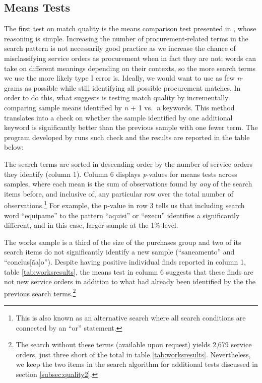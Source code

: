 \documentclass[11pt]{article}
\begin{document}
\subsection{Means Tests}\label{subsec:quality1}

The first test on match quality is the means comparison test presented in \citet{AssumpcaotextfindDataDrivenText2018}, whose reasoning is simple. Increasing the number of procurement-related terms in the search pattern is not necessarily good practice as we increase the chance of misclassifying service orders as procurement when in fact they are not; words can take on different meanings depending on their contexts, so the more search terms we use the more likely type I error is. Ideally, we would want to use as few \emph{n}-grams as possible while still identifying all possible procurement matches. In order to do this, what \citet{AssumpcaotextfindDataDrivenText2018} suggests is testing match quality by incrementally comparing sample means identified by \emph{n} + 1 vs.~\emph{n} keywords. This method translates into a check on whether the sample identified by one additional keyword is significantly better than the previous sample with one fewer term. The program developed by \citet{AssumpcaotextfindDataDrivenText2018} runs such check and the results are reported in the table below:


The search terms are sorted in descending order by the number of service orders they identify (column 1). Column 6 displays \emph{p}-values for means tests across samples, where each mean is the sum of observations found by \emph{any} of the search items before, and inclusive of, any particular row over the total number of observations.\footnote{This is also known as an alternative search where all search conditions are connected by an ``or'' statement.} For example, the p-value in row 3 tells us that including search word ``equipame'' to the pattern ``aquisi'' or ``execu'' identifies a significantly different, and in this case, larger sample at the 1\% level.

The works sample is a third of the size of the purchases group and two of its search items do not significantly identify a new sample (``saneamento'' and ``conclus{[}ãa{]}o''). Despite having positive individual finds reported in column 1, table \ref{tab:worksresults}, the means test in column 6 suggests that these finds are not new service orders in addition to what had already been identified by the the previous search terms.\footnote{The search without these terms (available upon request) yields 2,679 service orders, just three short of the total in table \ref{tab:worksresults}. Nevertheless, we keep the two items in the search algorithm for additional tests discussed in section \ref{subsec:quality2}.}

\end{document}
